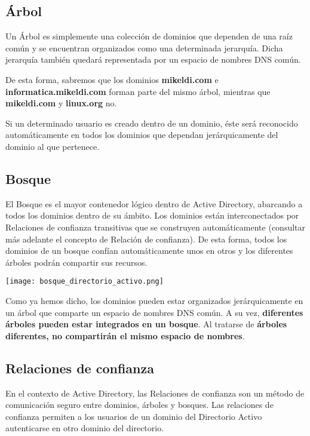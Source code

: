 \subsection{Árbol}
Un Árbol es simplemente una colección de dominios que dependen de una raíz común y se encuentran organizados como una determinada jerarquía. Dicha jerarquía también quedará representada por un espacio de nombres DNS común.

De esta forma, sabremos que los dominios \textbf{mikeldi.com} e \textbf{informatica.mikeldi.com} forman parte del mismo árbol, mientras que \textbf{mikeldi.com} y \textbf{linux.org} no.

Si un determinado usuario es creado dentro de un dominio, éste será reconocido automáticamente en todos los dominios que dependan jerárquicamente del dominio al que pertenece.


\subsection{Bosque}
El Bosque es el mayor contenedor lógico dentro de Active Directory, abarcando a todos los dominios dentro de su ámbito. Los dominios están interconectados por Relaciones de confianza transitivas que se construyen automáticamente (consultar más adelante el concepto de Relación de confianza). De esta forma, todos los dominios de un bosque confían automáticamente unos en otros y los diferentes árboles podrán compartir sus recursos.

\begin{center}
    \vspace{-15pt}
    \texttt{[image: bosque\_directorio\_activo.png]}
    \vspace{-15pt}
\end{center}

Como ya hemos dicho, los dominios pueden estar organizados jerárquicamente en un árbol que comparte un espacio de nombres DNS común. A su vez, \textbf{diferentes árboles pueden estar integrados en un bosque}. Al tratarse de \textbf{árboles diferentes, no compartirán el mismo espacio de nombres}.

\subsection{Relaciones de confianza}
En el contexto de Active Directory, las Relaciones de confianza son un método de comunicación seguro entre dominios, árboles y bosques. Las relaciones de confianza permiten a los usuarios de un dominio del Directorio Activo autenticarse en otro dominio del directorio.


